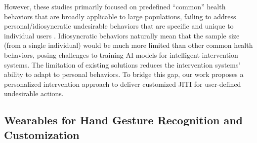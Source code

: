 
However, these studies primarily focused on predefined ``common'' health behaviors that are broadly applicable to large populations, failing to address personal/idiosyncratic undesirable behaviors that are specific and unique to individual users \cite{stein1998phenomenology, snorrason2012skin,teng2002body,oshio2018shake,stein2008trichotillomania}. 
Idiosyncratic behaviors naturally mean that the sample size (from a single individual) would be much more limited than other common health behaviors, posing challenges to training AI models for intelligent intervention systems.
The limitation of existing solutions reduces the intervention systems' ability to adapt to personal behaviors.
To bridge this gap, our work proposes a personalized intervention approach to deliver customized JITI for user-defined undesirable actions.



\subsection{Wearables for Hand Gesture Recognition and Customization}

